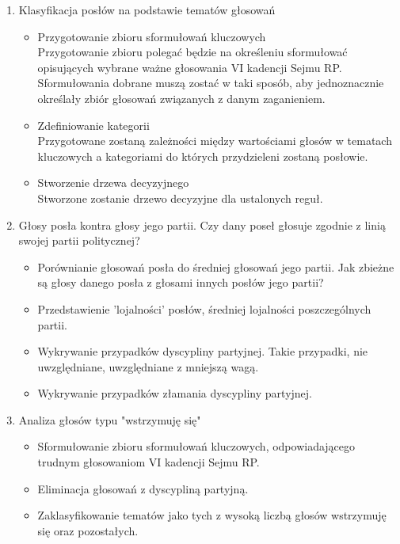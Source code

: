 \documentclass[a4 14pt]{report}
\begin{document}
			\begin{enumerate}

				\item{Klasyfikacja posłów na podstawie tematów głosowań}
				
					\begin{itemize}
						\item Przygotowanie zbioru sformułowań kluczowych\\
							Przygotowanie zbioru polegać będzie na określeniu sformułować opisujących wybrane ważne głosowania VI kadencji Sejmu RP. Sformułowania dobrane muszą zostać w taki sposób, aby jednoznacznie określały zbiór głosowań związanych z danym zaganieniem.

						\item Zdefiniowanie kategorii\\
							Przygotowane zostaną zależności między wartościami głosów w tematach kluczowych a kategoriami do których przydzieleni zostaną posłowie.
						\item Stworzenie drzewa decyzyjnego\\
							Stworzone zostanie drzewo decyzyjne dla ustalonych reguł.
					\end{itemize}


				\item{Głosy posła kontra głosy jego partii. Czy dany poseł głosuje zgodnie z linią swojej partii politycznej?}\\
					\begin{itemize}
						\item Porównianie głosowań posła do średniej głosowań jego partii. Jak zbieżne są głosy danego posła z głosami innych posłów jego partii?
						\item Przedstawienie 'lojalności' posłów, średniej lojalności poszczególnych partii.
						\item Wykrywanie przypadków dyscypliny partyjnej. Takie przypadki, nie uwzględniane, uwzględniane z mniejszą wagą.
						\item Wykrywanie przypadków złamania dyscypliny partyjnej.
					\end{itemize}
				\item{Analiza głosów typu "wstrzymuję się"}
					\begin{itemize}
						\item Sformułowanie zbioru sformułowań kluczowych, odpowiadającego trudnym głosowaniom VI kadencji Sejmu RP.
						\item Eliminacja głosowań z dyscypliną partyjną.
						\item Zaklasyfikowanie tematów jako tych z wysoką liczbą głosów wstrzymuję się oraz pozostałych.
					\end{itemize}
			\end{enumerate}
\end{document}

